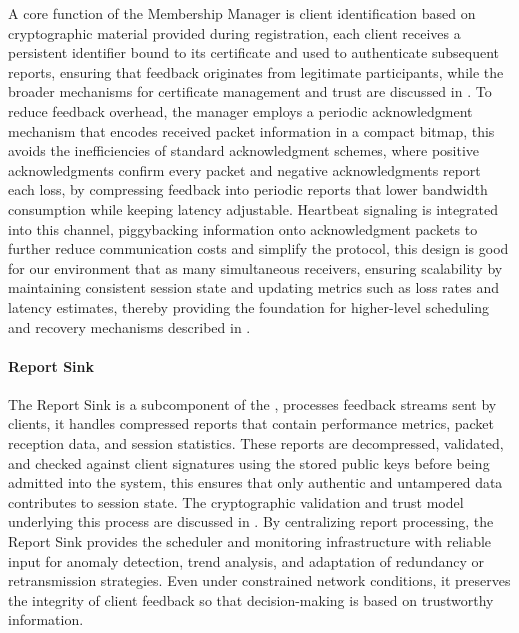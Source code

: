 \quad A core function of the Membership Manager is client identification based on cryptographic material provided during registration, each client receives a persistent identifier bound to its certificate and used to authenticate subsequent reports, ensuring that feedback originates from legitimate participants, while the broader mechanisms for certificate management and trust are discussed in \textbf{}. To reduce feedback overhead, the manager employs a periodic acknowledgment mechanism that encodes received packet information in a compact bitmap, this avoids the inefficiencies of standard acknowledgment schemes, where positive acknowledgments confirm every packet and negative acknowledgments report each loss, by compressing feedback into periodic reports that lower bandwidth consumption while keeping latency adjustable. Heartbeat signaling is integrated into this channel, piggybacking information onto acknowledgment packets to further reduce communication costs and simplify the protocol, this design is good for our environment that as many simultaneous receivers, ensuring scalability by maintaining consistent session state and updating metrics such as loss rates and latency estimates, thereby providing the foundation for higher-level scheduling and recovery mechanisms described in \textbf{}.

\paragraph{Report Sink}
\label{sec:report sink}

\quad The Report Sink is a subcomponent of the \textbf{}, processes feedback streams sent by clients, it handles compressed reports that contain performance metrics, packet reception data, and session statistics. These reports are decompressed, validated, and checked against client signatures using the stored public keys before being admitted into the system, this ensures that only authentic and untampered data contributes to session state. The cryptographic validation and trust model underlying this process are discussed in \textbf{}. By centralizing report processing, the Report Sink provides the scheduler and monitoring infrastructure with reliable input for anomaly detection, trend analysis, and adaptation of redundancy or retransmission strategies. Even under constrained network conditions, it preserves the integrity of client feedback so that decision-making is based on trustworthy information.

